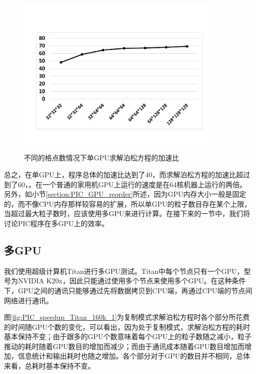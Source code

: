 \begin{figure}[!htb]
  \centering
  \includegraphics[width=0.9\textwidth]{Img/PIC_speedup_1GPU_Poisson.pdf}
  \caption{不同的格点数情况下单GPU求解泊松方程的加速比}
  \label{fig:PIC_speedup_1GPU_Poisson}
\end{figure}

总之，在单GPU上，程序总体的加速比达到了40，而求解泊松方程的加速比超过到了60，。在一个普通的家用机GPU上运行的速度是在64核机器上运行的两倍。
另外，如小节\ref{section:PIC_GPU_reorder}所述，因为GPU内存大小一般是固定的，而不像CPU内存那样较容易的扩展，所以单GPU的粒子数目存在某个上限，当超过最大粒子数时，应该使用多GPU来进行计算。在接下来的一节中，我们将讨论PIC程序在多GPU上的效率。

\subsection{多GPU}
我们使用超级计算机Titan进行多GPU测试。Titan中每个节点只有一个GPU，型号为NVIDIA K20x，因此只能通过使用多个节点来使用多个GPU。在这种条件下，GPU之间的通讯只能够通过先将数据拷贝到CPU端，再通过CPU端的节点间网络进行通讯。

图\ref{fig:PIC_speedup_Titan_160k_1}为复制模式求解泊松方程时各个部分所花费的时间随GPU个数的变化，可以看出，因为处于复制模式，求解泊松方程的耗时基本保持不变；由于跟多的GPU个数意味着每个GPU上的粒子数随之减小，粒子推动的耗时随着GPU数目的增加而减少；而由于通讯成本随着GPU数目增加而增加，信息统计和输出耗时也随之增加。各个部分对于GPU的数目并不相同，总体来看，总耗时基本保持不变。


